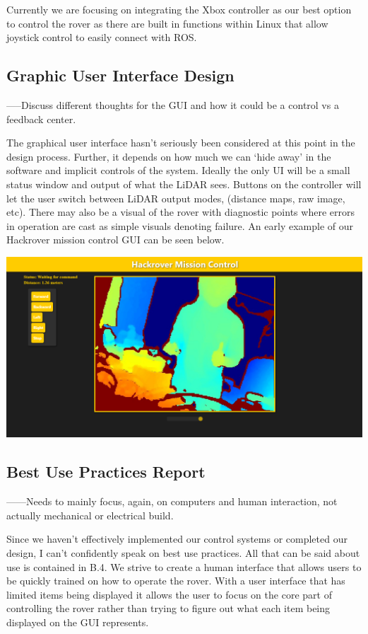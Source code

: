 \documentclass[a4paper, 10pt]{article}
\begin{document}
Currently we are focusing on integrating the Xbox controller as our best option to control the rover as there are built in functions within Linux that allow joystick control to easily connect with ROS. 


	\subsection{Graphic User Interface Design}
	-----Discuss different thoughts for the GUI and how it could be a control vs a feedback center.
	
	The graphical user interface hasn’t seriously been considered at this point in the design process. Further, it depends on how much we can ‘hide away’ in the software and implicit controls of the system. Ideally the only UI will be a small status window and output of what the LiDAR sees. Buttons on the controller will let the user switch between LiDAR output modes, (distance maps, raw image, etc). There may also be a visual of the rover with diagnostic points where errors in operation are cast as simple visuals denoting failure. An early example of our Hackrover mission control GUI can be seen below.
	
\begin{center}\includegraphics[scale=0.25]{hackrover mission control}
\end{center}

	\subsection{Best Use Practices Report}
	------Needs to mainly focus, again, on computers and human interaction, not actually mechanical or electrical build. 
	
	Since we haven't effectively implemented our control systems or completed our design, I can't confidently speak on best use practices. All that can be said about use is contained in B.4. We strive to create a human interface that allows users to be quickly trained on how to operate the rover. With a user interface that has limited items being displayed it allows the user to focus on the core part of controlling the rover rather than trying to figure out what each item being displayed on the GUI represents. 
	
\end{document}
